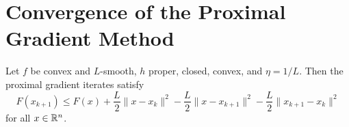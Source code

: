 \documentclass[11pt,a4paper]{article}
\begin{document}
\section{Convergence of the Proximal Gradient Method}%
\label{sec:convergence}

\begin{lemma}%
\label{lem:sufficient-decrease}
Let $f$ be convex and $L$-smooth, $h$ proper, closed, convex, and
$\eta = 1/L$. Then the proximal gradient iterates satisfy
\begin{equation}\label{eq:sufficient-decrease}
  F(x_{k+1}) \le F(x) + \frac{L}{2}\|x - x_k\|^2
  - \frac{L}{2}\|x - x_{k+1}\|^2 - \frac{L}{2}\|x_{k+1} - x_k\|^2
\end{equation}
for all $x \in \mathbb{R}^n$.
\end{lemma}
\end{document}
